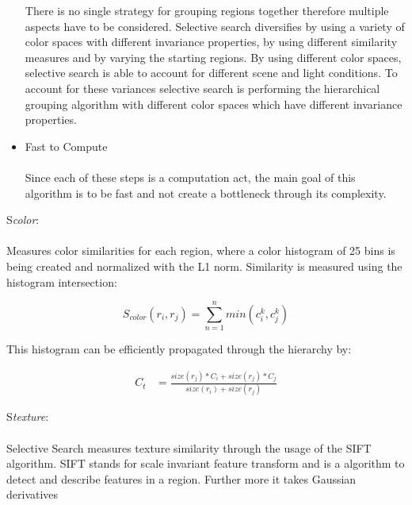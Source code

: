 \begin{itemize}
        There is no single strategy for grouping regions together therefore multiple aspects have to be considered. Selective search
        diversifies by using a variety of color spaces with different invariance properties, by using different similarity measures and by
        varying the starting regions.  By using different color spaces, selective search is able to account for different scene and light
        conditions. To account for these variances selective search is performing the hierarchical grouping algorithm with different color
        spaces which have different invariance properties. \\
    \item Fast to Compute \\ \\
        Since each of these steps is a computation act, the main goal of this algorithm is to be fast and not create a bottleneck through its complexity.\cite{selectivesearch}
\end{itemize}
{S}\emph{color}: \\ \\
Measures color similarities for each region, where a color histogram of 25 bins is being created and normalized
with the L1 norm. Similarity is measured using the histogram intersection:\cite{selectivesearch} \\
\begin{center}
    \begin{equation*}
        S_{color}(r_i,r_j) = \sum_{n=1}^{n} min(c_i^{k},c_j^{k})
    \end{equation*}\cite{selectivesearch}
\end{center}
This histogram can be efficiently propagated through the hierarchy by: \\
\begin{center}
    \begin{equation*}
        \begin{split}
            C_t & = \frac{size(r_j)*C_i+size(r_j)*C_j}{size(r_i)+size(r_j)}
        \end{split}
    \end{equation*}\cite{selectivesearch}
\end{center}
{S}\emph{texture}: \\ \\
Selective Search measures texture similarity through the usage of the SIFT algorithm. SIFT stands for scale invariant
feature transform and is a algorithm to detect and describe features in a region. Further more it takes Gaussian derivatives
